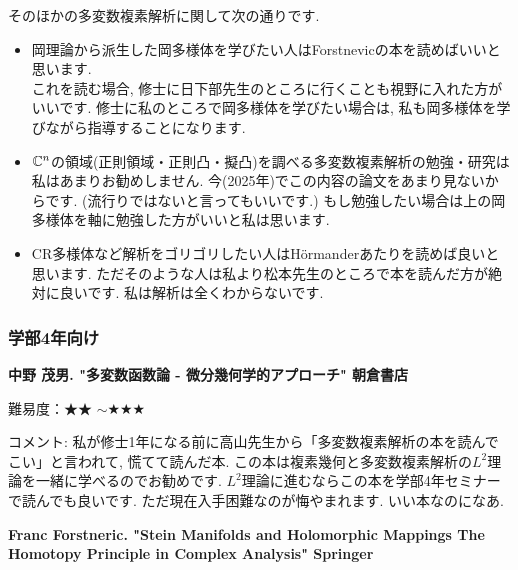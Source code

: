 そのほかの多変数複素解析に関して次の通りです. 
\vspace{-8pt}
\begin{tcolorbox}[mybox]
\begin{itemize}[left=0pt]
  \setlength{\parskip}{0cm} %
  \setlength{\itemsep}{5pt} %
\item 岡理論から派生した岡多様体を学びたい人はForstnevicの本を読めばいいと思います.  \\ これを読む場合, 修士に日下部先生のところに行くことも視野に入れた方がいいです. 修士に私のところで岡多様体を学びたい場合は, 私も岡多様体を学びながら指導することになります. 
\item $\mathbb{C}^n$の領域(正則領域・正則凸・擬凸)を調べる多変数複素解析の勉強・研究は私はあまりお勧めしません. 今(2025年)でこの内容の論文をあまり見ないからです. (流行りではないと言ってもいいです.) もし勉強したい場合は上の岡多様体を軸に勉強した方がいいと私は思います. 
\item CR多様体など解析をゴリゴリしたい人はH\"ormanderあたりを読めば良いと思います. ただそのような人は私より松本先生のところで本を読んだ方が絶対に良いです. 私は解析は全くわからないです. 
\end{itemize}
\end{tcolorbox}


\subsubsection{学部4年向け}

\textbf{中野 茂男. "多変数函数論 - 微分幾何学的アプローチ" 朝倉書店}  　\vspace{-6pt} 

難易度：★★ $\sim$★★★ 　\vspace{-6pt} 

コメント: 私が修士1年になる前に高山先生から「多変数複素解析の本を読んでこい」と言われて, 慌てて読んだ本. この本は複素幾何と多変数複素解析の$L^2$理論を一緒に学べるのでお勧めです. $L^2$理論に進むならこの本を学部4年セミナーで読んでも良いです. ただ現在入手困難なのが悔やまれます. いい本なのになあ. 

\vspace{8pt}

\textbf{Franc Forstneric. "Stein Manifolds and Holomorphic Mappings
The Homotopy Principle in Complex Analysis" Springer}   \vspace{-6pt} 

